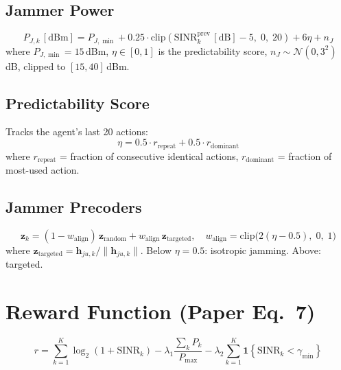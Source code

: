 \documentclass[11pt,a4paper]{article}
\begin{document}
\subsection{Jammer Power}

\begin{equation}
P_{J,k}\,[\text{dBm}] = P_{J,\min} + 0.25 \cdot \mathrm{clip}(\mathrm{SINR}_{k}^{\mathrm{prev}}\,[\text{dB}] - 5,\; 0,\; 20) + 6\eta + n_J
\end{equation}
where $P_{J,\min} = 15$\,dBm, $\eta \in [0,1]$ is the predictability score, $n_J \sim \mathcal{N}(0, 3^2)$\,dB, clipped to $[15, 40]$\,dBm.

\subsection{Predictability Score}

Tracks the agent's last 20 actions:
\begin{equation}
\eta = 0.5 \cdot r_{\mathrm{repeat}} + 0.5 \cdot r_{\mathrm{dominant}}
\end{equation}
where $r_{\mathrm{repeat}}$ = fraction of consecutive identical actions, $r_{\mathrm{dominant}}$ = fraction of most-used action.

\subsection{Jammer Precoders}

\begin{equation}
\mathbf{z}_k = (1 - w_{\mathrm{align}})\, \mathbf{z}_{\mathrm{random}} + w_{\mathrm{align}}\, \mathbf{z}_{\mathrm{targeted}}, \quad w_{\mathrm{align}} = \mathrm{clip}\big(2(\eta - 0.5),\; 0,\; 1\big)
\end{equation}
where $\mathbf{z}_{\mathrm{targeted}} = \mathbf{h}_{ju,k} / \|\mathbf{h}_{ju,k}\|$. Below $\eta = 0.5$: isotropic jamming. Above: targeted.


\section{Reward Function (Paper Eq.~7)}

\begin{equation}
\boxed{r = \sum_{k=1}^{K} \log_2(1 + \mathrm{SINR}_k) - \lambda_1 \frac{\sum_k P_k}{P_{\max}} - \lambda_2 \sum_{k=1}^{K} \mathbf{1}\!\left\{\mathrm{SINR}_k < \gamma_{\min}\right\}}
\end{equation}
\end{document}
